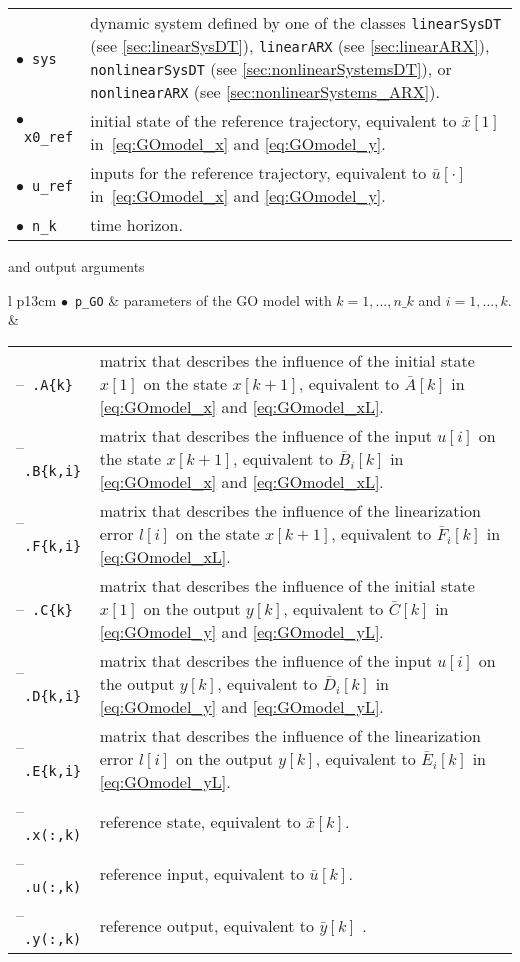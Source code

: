 \begin{center}
\renewcommand{\arraystretch}{1.3}
\begin{tabular}[t]{l p{13cm} }
	$\bullet$~\texttt{sys} & dynamic system defined by one of the classes \texttt{linearSysDT} (see \cref{sec:linearSysDT}), \texttt{linearARX} (see \cref{sec:linearARX}), \texttt{nonlinearSysDT} (see \cref{sec:nonlinearSystemsDT}), or \texttt{nonlinearARX} (see \cref{sec:nonlinearSystems_ARX}). \\
	$\bullet$~\texttt{x0\_ref} & initial state of the reference trajectory, equivalent to $\bar{x}[1]$ in~\eqref{eq:GOmodel_x} and \eqref{eq:GOmodel_y}. \\
	$\bullet$~\texttt{u\_ref} & inputs for the reference trajectory, equivalent to $\bar{u}[\cdot]$ in~\eqref{eq:GOmodel_x} and \eqref{eq:GOmodel_y}. \\
	$\bullet$~\texttt{n\_k} & time horizon. 
\end{tabular}
\end{center}

and output arguments

\begin{center}
\renewcommand{\arraystretch}{1.3}
\begin{tabular}[t]{l p{13cm} }
	$\bullet$~\texttt{p\_GO} & parameters of the GO model with $k=1,...,n\_k$ and $i=1,...,k$. \\
	& \begin{tabular}[t]{l p{10cm}}
		--~\texttt{.A\{k\}} & matrix that describes the influence of the initial state $x[1]$ on the state $x[k+1]$, equivalent to $\bar{A}[k]$ in \eqref{eq:GOmodel_x} and \eqref{eq:GOmodel_xL}.\\
		--~\texttt{.B\{k,i\}} & matrix that describes the influence of the input $u[i]$ on the state $x[k+1]$, equivalent to $\bar{B}_i[k]$ in \eqref{eq:GOmodel_x} and \eqref{eq:GOmodel_xL}.\\
		--~\texttt{.F\{k,i\}} & matrix that describes the influence of the linearization error $l[i]$ on the state $x[k+1]$, equivalent to $\bar{F}_i[k]$ in \eqref{eq:GOmodel_xL}.\\
		--~\texttt{.C\{k\}} & matrix that describes the influence of the initial state $x[1]$ on the output $y[k]$, equivalent to $\bar{C}[k]$ in \eqref{eq:GOmodel_y} and \eqref{eq:GOmodel_yL}.\\
		--~\texttt{.D\{k,i\}} & matrix that describes the influence of the input $u[i]$ on the output $y[k]$, equivalent to $\bar{D}_i[k]$ in \eqref{eq:GOmodel_y} and \eqref{eq:GOmodel_yL}.\\
		--~\texttt{.E\{k,i\}} & matrix that describes the influence of the linearization error $l[i]$ on the output $y[k]$, equivalent to $\bar{E}_i[k]$ in \eqref{eq:GOmodel_yL}.\\
		--~\texttt{.x(:,k)} & reference state, equivalent to $\bar{x}[k]$. \\
		--~\texttt{.u(:,k)} & reference input, equivalent to $\bar{u}[k]$.\\
		--~\texttt{.y(:,k)} & reference output, equivalent to $\bar{y}[k]$ .
	\end{tabular}
\end{tabular}
\end{center}


